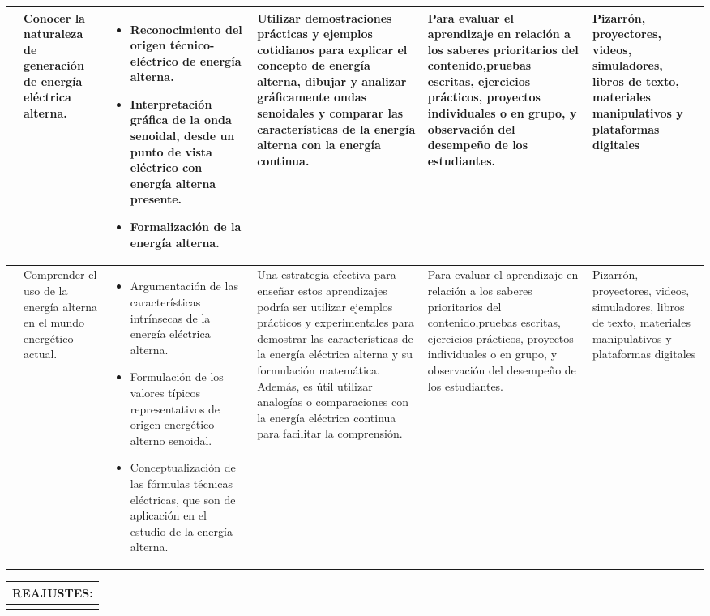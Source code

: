 \documentclass[a4paper,12pt]{article}
\newcommand{\vertical}[1]{\rotatebox[origin=r]{90}{#1}}
\newcommand{\evaluacion}{Para evaluar el aprendizaje en relación a los saberes prioritarios del contenido,pruebas escritas, ejercicios prácticos, proyectos individuales o en
grupo, y observación del desempeño de los estudiantes.}
\newcommand{\recursos}{Pizarrón, proyectores, videos, simuladores, libros de texto, materiales manipulativos y plataformas digitales}
\begin{document}
\begin{longtable}[h!]{|p{1cm}|p{3cm}|p{8cm}|p{6cm}|p{3.5cm}|p{3cm}|}
\vertical{PRINCIPIOS FUNDAMENTALES DE LA ENERGÍA ALTERNA} & Conocer la naturaleza de
generación de energía
eléctrica alterna.  & \begin{itemize}
    \item Reconocimiento del origen técnico-eléctrico de energía
alterna.
\item Interpretación gráfica de la onda senoidal, desde un punto
de vista eléctrico con energía alterna presente.
\item Formalización de la energía alterna. 
\end{itemize}& Utilizar demostraciones prácticas y ejemplos cotidianos para explicar el concepto de energía alterna, dibujar y analizar gráficamente ondas senoidales y comparar las características de la energía alterna con la energía continua. &\evaluacion & \recursos \\
\hline
& Comprender el uso de la
energía alterna en el
mundo energético actual. & \begin{itemize}
    \item  Argumentación de las características intrínsecas de la
energía eléctrica alterna.
\item Formulación de los valores típicos representativos de
origen energético alterno senoidal.
\item Conceptualización de las fórmulas técnicas eléctricas, que
son de aplicación en el estudio de la energía alterna. 
\end{itemize} & Una estrategia efectiva para enseñar estos aprendizajes podría ser utilizar ejemplos prácticos y experimentales para demostrar las características de la energía eléctrica alterna y su formulación matemática. Además, es útil utilizar analogías o comparaciones con la energía eléctrica continua para facilitar la comprensión. &\evaluacion & \recursos   \\ \hline

\end{longtable}

\begin{table}[h!]
    \begin{tabular}{| p{27cm} | } \hline
      REAJUSTES:   \\ \hline
      \vspace{7cm}\\ \hline
    \end{tabular}
\end{table}
\newpage
%
%
\end{document}
